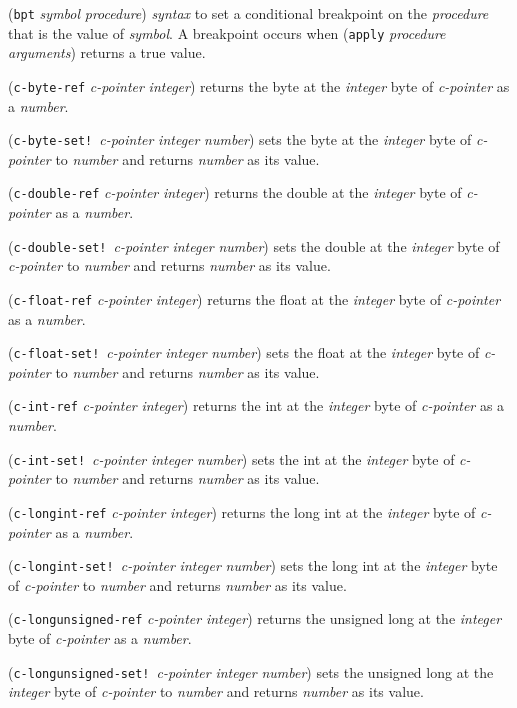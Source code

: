 \documentclass[10pt,twocolumn]{article}
\begin{document}
(\texttt{bpt} \emph{symbol} \emph{procedure}) \emph{syntax} to set a conditional
breakpoint on the \emph{procedure} that is the value of \emph{symbol}.  A
breakpoint occurs when (\texttt{apply} \emph{procedure} \emph{arguments})
returns a true value.

(\texttt{c-byte-ref} \emph{c-pointer} \emph{integer}) returns the byte at the
\emph{integer} byte of \emph{c-pointer} as a \emph{number}.

(\texttt{c-byte-set!}\ \emph{c-pointer} \emph{integer} \emph{number}) sets the byte
at the \emph{integer} byte of \emph{c-pointer} to \emph{number} and returns
\emph{number} as its value.

(\texttt{c-double-ref} \emph{c-pointer} \emph{integer}) returns the double at
the \emph{integer} byte of \emph{c-pointer} as a \emph{number}.

(\texttt{c-double-set!}\ \emph{c-pointer} \emph{integer} \emph{number}) sets the
double at the \emph{integer} byte of \emph{c-pointer} to \emph{number} and
returns \emph{number} as its value.

(\texttt{c-float-ref} \emph{c-pointer} \emph{integer}) returns the float at
the \emph{integer} byte of \emph{c-pointer} as a \emph{number}.

(\texttt{c-float-set!}\ \emph{c-pointer} \emph{integer} \emph{number}) sets the
float at the \emph{integer} byte of \emph{c-pointer} to \emph{number} and
returns \emph{number} as its value.

(\texttt{c-int-ref} \emph{c-pointer} \emph{integer}) returns the int at the
\emph{integer} byte of \emph{c-pointer} as a \emph{number}.

(\texttt{c-int-set!}\ \emph{c-pointer} \emph{integer} \emph{number}) sets the
int at the \emph{integer} byte of \emph{c-pointer} to \emph{number} and
returns \emph{number} as its value.

(\texttt{c-longint-ref} \emph{c-pointer} \emph{integer}) returns the long int at the
\emph{integer} byte of \emph{c-pointer} as a \emph{number}.

(\texttt{c-longint-set!}\ \emph{c-pointer} \emph{integer} \emph{number}) sets the
long int at the \emph{integer} byte of \emph{c-pointer} to \emph{number} and
returns \emph{number} as its value.

(\texttt{c-longunsigned-ref} \emph{c-pointer} \emph{integer}) returns the
unsigned long at the \emph{integer} byte of \emph{c-pointer} as a
\emph{number}.

(\texttt{c-longunsigned-set!}\ \emph{c-pointer} \emph{integer} \emph{number}) sets the
unsigned long at the \emph{integer} byte of \emph{c-pointer} to \emph{number} and
returns \emph{number} as its value.
\end{document}

